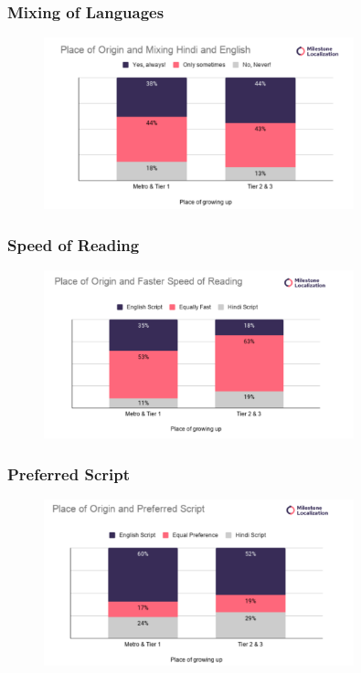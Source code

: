 \documentclass{article}
\begin{document}
\subsubsection{Mixing of Languages}

\begin{figure}[H]
    \centering
    \includegraphics[width=0.8\textwidth]{plots/origin_mixing_language.png}
\end{figure}

\subsubsection{Speed of Reading}

\begin{figure}[H]
    \centering
    \includegraphics[width=0.8\textwidth]{plots/origin_faster_read.png}
\end{figure}

\subsubsection{Preferred Script}

\begin{figure}[H]
    \centering
    \includegraphics[width=0.8\textwidth]{plots/origin_preferred_script.png}
\end{figure}
\end{document}
